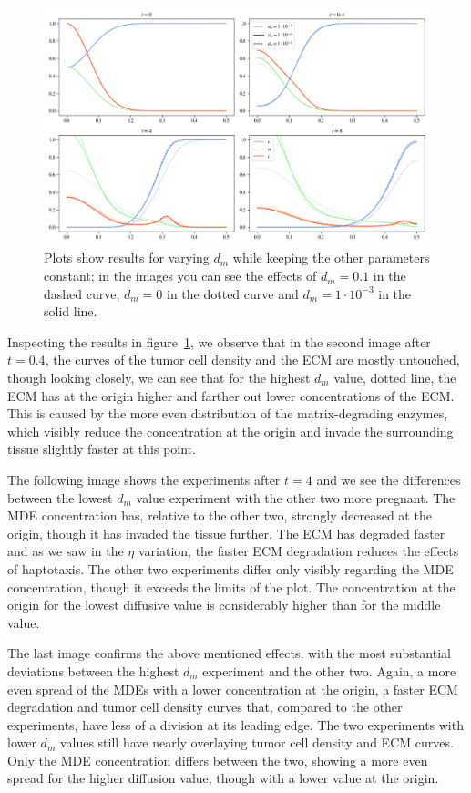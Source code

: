 \begin{figure}[h]
 \centering
 \includegraphics[width=\textwidth]{resources/images/dm_variation.png}
 \caption{Plots show results for varying $d_m$ while keeping the other parameters constant; in the images you can see the effects of $d_m=0.1$ in the dashed curve, $d_m=0$ in the dotted curve and $d_m=1\cdot 10^{-3}$ in the solid line.}
 \label{fig:dm_variation}
\end{figure}
Inspecting the results in figure~\ref{fig:dm_variation}, we observe that in the second image after $t=0.4$, the curves of the tumor cell density and the ECM are mostly untouched, though looking closely, we can see that for the highest $d_m$ value, dotted line, the ECM has at the origin higher and farther out lower concentrations of the ECM. This is caused by the more even distribution of the matrix-degrading enzymes, which visibly reduce the concentration at the origin and invade the surrounding tissue slightly faster at this point.

The following image shows the experiments after $t=4$ and we see the differences between the lowest $d_m$ value experiment with the other two more pregnant. The MDE concentration has, relative to the other two, strongly decreased at the origin, though it has invaded the tissue further. The ECM has degraded faster and as we saw in the $\eta$ variation, the faster ECM degradation reduces the effects of haptotaxis. The other two experiments differ only visibly regarding the MDE concentration, though it exceeds the limits of the plot. The concentration at the origin for the lowest diffusive value is considerably higher than for the middle value.

The last image confirms the above mentioned effects, with the most substantial deviations between the highest $d_m$ experiment and the other two. Again, a more even spread of the MDEs with a lower concentration at the origin, a faster ECM degradation and tumor cell density curves that, compared to the other experiments, have less of a division at its leading edge. The two experiments with lower $d_m$ values still have nearly overlaying tumor cell density and ECM curves. Only the MDE concentration differs between the two, showing a more even spread for the higher diffusion value, though with a lower value at the origin. 

